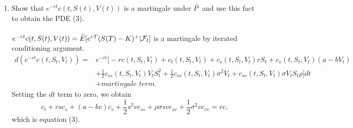 \documentclass[11pt,a4,table]{article}
\begin{document}
\begin{enumerate}
    \begin{enumerate}
        \item Show that $e^{-rt}c(t,S(t),V(t))$ is a martingale under $\Tilde{P}$ and use this fact to obtain the PDE (3).\\\\
        $e^{-rt}c(t,S(t),V(t)) = \Tilde{E}[e^{rT}(S(T)-K)^+|\mathcal{F}_t]$ is a martingale by iterated conditioning argument.
        \begin{align*}
            d(e^{-rt}c(t,S_t,V_t)) = &e^{-rt}\bigg[-rc(t,S_t,V_t) + c_t(t,S_t,V_t) + c_s(t,S_t,V_t)rS_t + c_v(t,S_t,V_t)(a-bV_t) \\
            &+ \frac{1}{2}c_{ss}(t,S_t,V_t)V_tS_t^2 + \frac{1}{2}c_{vv}(t,S_t,V_t)\sigma^2V_t + c_{sv}(t,S_t,V_t)\sigma V_tS_t\rho\bigg] dt\\
            &+\textit{martingale term.}
        \end{align*}
        Setting the $dt$ term to zero, we obtain
        \begin{equation*}
            c_t + rsc_s + (a-bv)c_v + \frac{1}{2}s^2vc_{ss} + \rho\sigma svc_{sv} + \frac{1}{2}\sigma^2vc_{vv} = rc,
        \end{equation*}
        which is equation (3).
    

\end{enumerate}
\end{enumerate}
\end{document}
